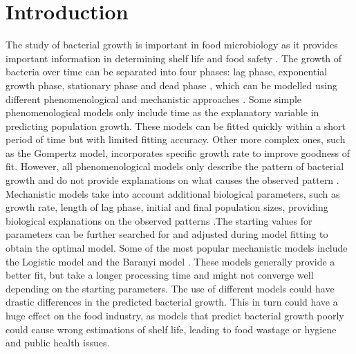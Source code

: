 \documentclass[11pt]{article}
\begin{document}
\section{Introduction}
The study of bacterial growth is important in food microbiology as it provides important information in determining shelf life and food safety \cite{zwietering_modeling_1990}. The growth of bacteria over time can be separated into four phases: lag phase, exponential growth phase, stationary phase and dead phase \cite{wang_bacterial_2015}, which can be modelled using different phenomenological and mechanistic approaches \cite{johnson_model_2004, peleg_microbial_2011}. Some simple phenomenological models only include time as the explanatory variable in predicting population growth. These models can be fitted quickly within a short period of time but with limited fitting accuracy. Other more complex ones, such as the Gompertz model, incorporates specific growth rate to improve goodness of fit. However, all phenomenological models only describe the pattern of bacterial growth and do not provide explanations on what causes the observed pattern \cite{peleg_microbial_2011}. Mechanistic models take into account additional biological parameters, such as growth rate, length of lag phase, initial and final population sizes, providing biological explanations on the observed patterns \cite{zwietering_modeling_1990}.The starting values for parameters can be further searched for and adjusted during model fitting to obtain the optimal model. Some of the most popular mechanistic models include the Logistic model \cite{zwietering_modeling_1990} and the Baranyi model \cite{baranyi_dynamic_1994}. These models generally provide a better fit, but take a longer processing time and might not converge well depending on the starting parameters. The use of different models could have drastic differences in the predicted bacterial growth. This in turn could have a huge effect on the food industry, as models that predict bacterial growth poorly could cause wrong estimations of shelf life, leading to food wastage or hygiene and public health issues. 
\vspace{\baselineskip}
\end{document}
